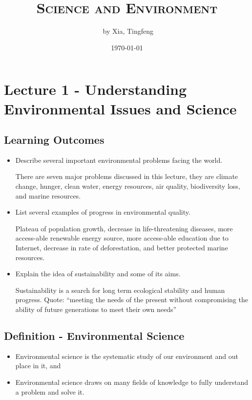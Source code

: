 \documentclass[10pt]{article}
\author{\ccLogo \,\,by Xia, Tingfeng}
\title{\textsc{Science and Environment}}
\date{\today}
\begin{document}
\maketitle
\doclicenseThis
\tableofcontents
\newpage
\section{Lecture 1 - Understanding Environmental Issues and Science}
\subsection{Learning Outcomes}
\begin{itemize}
    \item Describe several important environmental problems facing the world.
    \begin{mdframed}
        There are seven major problems discussed in this lecture, they are climate change, hunger, clean water, energy resources, air quality, biodiversity loss, and marine resources. 
    \end{mdframed}
    \item List several examples of progress in environmental quality.
    \begin{mdframed}
        Plateau of population growth, decrease in life-threatening diseases, more access-able renewable energy source, more access-able education due to Internet, decrease in rate of deforestation, and better protected marine resources. 
    \end{mdframed}
    \item Explain the idea of sustainability and some of its aims.
    \begin{mdframed}
        Sustainability is a search for long term ecological stability and human progress. Quote: ``meeting the needs of the present without compromising the ability of future generations to meet their own needs''
    \end{mdframed}
\end{itemize}

\subsection{Definition - Environmental Science}
\begin{itemize}
    \item Environmental science is the systematic study of our environment and out place in it, and
    \item Environmental science draws on many fields of knowledge to fully understand a problem and solve it. 
\end{itemize}
\end{document}
